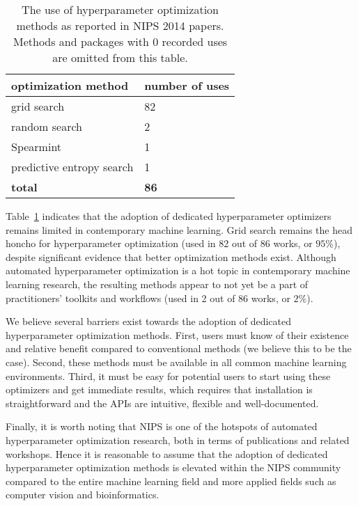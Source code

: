 \begin{subappendices}
\begin{table}[!h]
\centering
\begin{tabular}{ll}
\toprule
\textbf{optimization method} & \textbf{number of uses} \\
\midrule
grid search & 82 \\
random search & 2 \\
Spearmint \citep{snoek2012practical} & 1 \\
predictive entropy search \citep{hernandez2014predictive} & 1  \\
\midrule
\textbf{total} & \textbf{86} \\
\bottomrule
\end{tabular}
\caption{The use of hyperparameter optimization methods as reported in NIPS 2014 papers. Methods and packages with 0 recorded uses are omitted from this table.} \label{table:survey}
\end{table}

Table~\ref{table:survey} indicates that the adoption of dedicated hyperparameter optimizers remains limited in contemporary machine learning. Grid search remains the head honcho for hyperparameter optimization (used in 82 out of 86 works, or $95\%$), despite significant evidence that better optimization methods exist. Although automated hyperparameter optimization is a hot topic in contemporary machine learning research, the resulting methods appear to not yet be a part of practitioners' toolkits and workflows (used in 2 out of 86 works, or $2\%$). 

We believe several barriers exist towards the adoption of dedicated hyperparameter optimization methods. First, users must know of their existence and relative benefit compared to conventional methods (we believe this to be the case). Second, these methods must be available in all common machine learning environments. Third, it must be easy for potential users to start using these optimizers and get immediate results, which requires that installation is straightforward and the APIs are intuitive, flexible and well-documented.

Finally, it is worth noting that NIPS is one of the hotspots of automated hyperparameter optimization research, both in terms of publications and related workshops. Hence it is reasonable to assume that the adoption of dedicated hyperparameter optimization methods is elevated within the NIPS community compared to the entire machine learning field and more applied fields such as computer vision and bioinformatics.



\end{subappendices}
